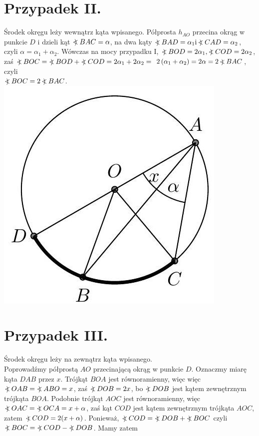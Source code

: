 \documentclass[10pt]{article}
\newcommand\Varangle{\mathop{{<\!\!\!\!\!\text{\small)}}\:}\nolimits}
\begin{document}
\section*{Przypadek II.}
Środek okręgu leży wewnątrz kąta wpisanego. Półprosta \(h_{A O}\) przecina okrąg w punkcie \(D\) i dzieli kąt \(\Varangle B A C=\alpha\), na dwa kąty \(\Varangle B A D=\alpha_{1} \mathrm{i} \Varangle C A D=\alpha_{2}\), czyli \(\alpha=\alpha_{1}+\alpha_{2}\). Wówczas na mocy przypadku I, \(\Varangle B O D=2 \alpha_{1}, \Varangle C O D=2 \alpha_{2}\), zaś \(\Varangle B O C=\Varangle B O D+\Varangle C O D=2 \alpha_{1}+2 \alpha_{2}=\) \(2\left(\alpha_{1}+\alpha_{2}\right)=2 \alpha=2 \Varangle B A C\), czyli\\
\(\Varangle B O C=2 \Varangle B A C\).\\
\includegraphics[max width=\textwidth, center]{2024_11_21_71f62bd117d375398909g-181}

\section*{Przypadek III.}
Środek okręgu leży na zewnątrz kąta wpisanego.\\
Poprowadźmy półprostą \(A O\) przecinającą okrąg w punkcie \(D\). Oznaczmy miarę kąta \(D A B\) przez \(x\). Trójkąt \(B O A\) jest równoramienny, więc więc \(\Varangle O A B=\Varangle A B O=x\), zaś \(\Varangle D O B=2 x\), bo \(\Varangle D O B\) jest kątem zewnętrznym trójkąta \(B O A\). Podobnie trójkąt \(A O C\) jest równoramienny, więc\\
\(\Varangle O A C=\Varangle O C A=x+\alpha\), zaś kąt \(C O D\) jest kątem zewnętrznym trójkąta \(A O C\), zatem \(\Varangle C O D=2(x+\alpha)\). Ponieważ, \(\Varangle C O D=\Varangle D O B+\Varangle B O C\) czyli \(\Varangle B O C=\Varangle C O D-\Varangle D O B\). Mamy zatem
\end{document}
